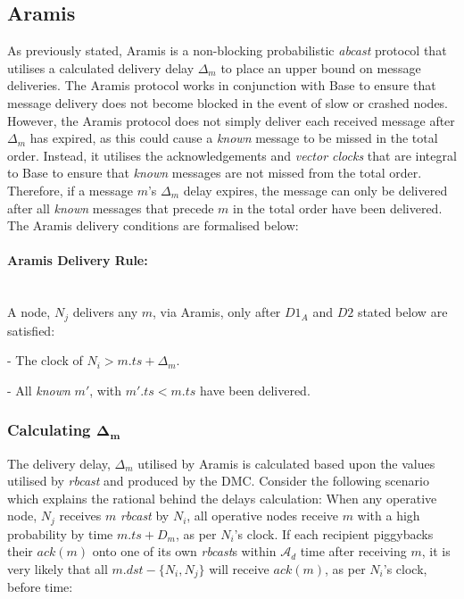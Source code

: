     \subsection{Aramis}\label{ssec:aramis}
    As previously stated,  \textsf{Aramis} is a non-blocking probabilistic \emph{abcast} protocol that utilises a calculated delivery delay $\Delta_m$ to place an upper bound on message deliveries.  The \textsf{Aramis} protocol works in conjunction with \textsf{Base} to ensure that message delivery does not become blocked in the event of slow or crashed nodes.  However, the \textsf{Aramis} protocol does not simply deliver each received message after $\Delta_m$ has expired, as this could cause a \emph{known} message to be missed in the total order.  Instead, it utilises the acknowledgements and \emph{vector clocks} that are integral to \textsf{Base} to ensure that \emph{known} messages are not missed from the total order.  Therefore, if a message $m$'s $\Delta_m$ delay expires, the message can only be delivered after all \emph{known} messages that precede $m$ in the total order have been delivered.  The \textsf{Aramis} delivery conditions are formalised below:
    
    \paragraph{\textsf{Aramis} Delivery Rule:}\hspace{0pt} \\
	    A node, $N_j$ delivers any $m$, via \textsf{Aramis}, only after $D1_A$ and $D2$ stated below are satisfied:
	    \begin{description}[labelindent=1cm]
	        \item[$\boldsymbol{D1_A}$] - The clock of $N_i > m.ts + \Delta_{m}$. 
	        \item[$\boldsymbol{D2}$] - All \emph{known} $m'$, with $m'.ts < m.ts$ have been delivered.
	    \end{description}
    
    
        \subsubsection*{Calculating $\boldsymbol{\Delta_m}$    }
		The delivery delay, $\Delta_m$ utilised by \textsf{Aramis} is calculated based upon the values utilised by \emph{rbcast} and produced by the DMC.  Consider the following scenario which explains the rational behind the delays calculation: When any operative node, $N_j$ receives $m$ \emph{rbcast} by $N_i$, all operative nodes receive $m$ with a high probability by time $m.ts + D_m$, as per $N_i$'s clock.  If each recipient piggybacks their $ack(m)$ onto one of its own \emph{rbcast}s within $\mathcal{A}_d$ time after receiving $m$, it is very likely that all $m.dst - \{N_i, N_j\}$ will receive $ack(m)$, as per $N_i$'s clock, before time:
		
